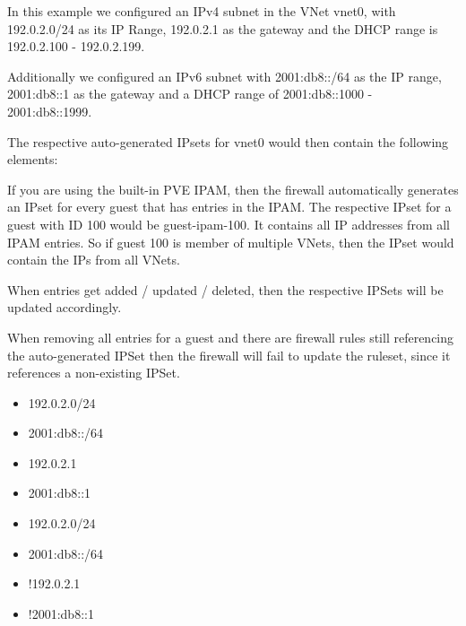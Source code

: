 In this example we configured an IPv4 subnet in the VNet vnet0, with 192.0.2.0/24 as its IP Range, 192.0.2.1 as the gateway and the DHCP range is 192.0.2.100 - 192.0.2.199.

Additionally we configured an IPv6 subnet with 2001:db8::/64 as the IP range, 2001:db8::1 as the gateway and a DHCP range of 2001:db8::1000 - 2001:db8::1999.

The respective auto-generated IPsets for vnet0 would then contain the following elements:

If you are using the built-in PVE IPAM, then the firewall automatically generates an IPset for every guest that has entries in the IPAM. The respective IPset for a guest with ID 100 would be guest-ipam-100. It contains all IP addresses from all IPAM entries. So if guest 100 is member of multiple VNets, then the IPset would contain the IPs from all VNets.

When entries get added / updated / deleted, then the respective IPSets will be updated accordingly.

When removing all entries for a guest and there are firewall rules still referencing the auto-generated IPSet then the firewall will fail to update the ruleset, since it references a non-existing IPSet.

\begin{itemize}[leftmargin=2cm]

	\item 192.0.2.0/24

	\item 2001:db8::/64

\end{itemize}

\begin{itemize}[leftmargin=2cm]

	\item 192.0.2.1

	\item 2001:db8::1

\end{itemize}

\begin{itemize}[leftmargin=2cm]

	\item 192.0.2.0/24

	\item 2001:db8::/64

	\item !192.0.2.1

	\item !2001:db8::1

\end{itemize}

